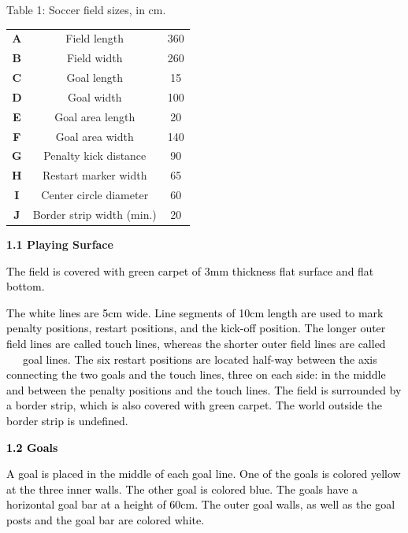 \documentclass[a4paper]{article}
\begin{document}
\begin{center}
Table 1: Soccer field sizes, in cm.

\bigskip
\begin{tabular}{ c c c }
\textbf{A} & Field length & 360 \\
\textbf{B} & Field width & 260 \\
\textbf{C} & Goal length & 15 \\
\textbf{D} & Goal width & 100 \\
\textbf{E} & Goal area length & 20 \\
\textbf{F} & Goal area width & 140 \\
\textbf{G} & Penalty kick distance & 90 \\
\textbf{H} & Restart marker width & 65 \\
\textbf{I} & Center circle diameter & 60 \\
\textbf{J} & Border strip width (min.) & 20 \\
\end{tabular}
\end{center}
\newpage

\textbf{1.1 Playing Surface}

\textcolor{black}{The field is covered with green carpet of 3mm thickness flat surface and flat bottom. }

\textcolor{black}{The white lines are 5cm wide. Line segments of 10cm length are used to mark penalty positions, restart
positions, and the kick-off position. The longer outer field lines are called touch lines, whereas the shorter outer
field lines are called}\textcolor{black}{ }\textcolor{red}{\ \ \ }\textcolor{black}{goal lines. The six restart
positions are located half-way between the axis connecting the two goals and the touch lines, three on each side: in
the middle and between the penalty positions and the touch lines. The field is surrounded by a border strip, which is
also covered with green carpet. The world outside the border strip is undefined.}

\textbf{\textcolor{black}{1.2 Goals}}

\textcolor{black}{A goal is placed in the middle of each goal line. One of the goals is colored yellow at the three
inner walls. The other goal is colored blue. The goals have a horizontal goal bar at a height of 60cm. The outer goal
walls, as well as the goal posts and the goal bar are colored white.}
\end{document}
